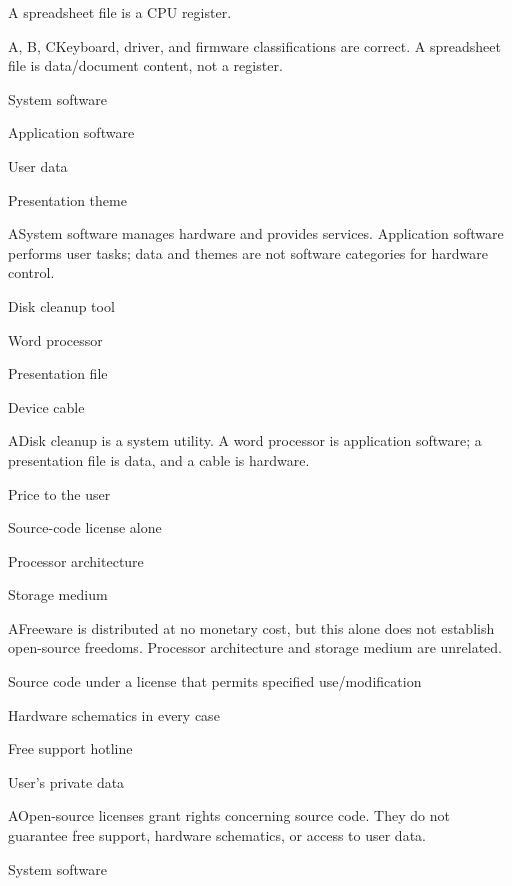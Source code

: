 \begin{enumerate}[label=\textbf{Q\arabic*.}, leftmargin=*]
{   \item A spreadsheet file is a CPU register.}
  {A, B, C}{Keyboard, driver, and firmware classifications are correct. A spreadsheet file is data/document content, not a register.}
\fi
\ifnum{}
  {\item System software
   \item Application software
   \item User data
   \item Presentation theme}
  {A}{System software manages hardware and provides services. Application software performs user tasks; data and themes are not software categories for hardware control.}
  {\item Disk cleanup tool
   \item Word processor
   \item Presentation file
   \item Device cable}
  {A}{Disk cleanup is a system utility. A word processor is application software; a presentation file is data, and a cable is hardware.}
  {\item Price to the user
   \item Source-code license alone
   \item Processor architecture
   \item Storage medium}
  {A}{Freeware is distributed at no monetary cost, but this alone does not establish open-source freedoms. Processor architecture and storage medium are unrelated.}
  {\item Source code under a license that permits specified use/modification
   \item Hardware schematics in every case
   \item Free support hotline
   \item User's private data}
  {A}{Open-source licenses grant rights concerning source code. They do not guarantee free support, hardware schematics, or access to user data.}
  {\item System software
}
\end{enumerate}
